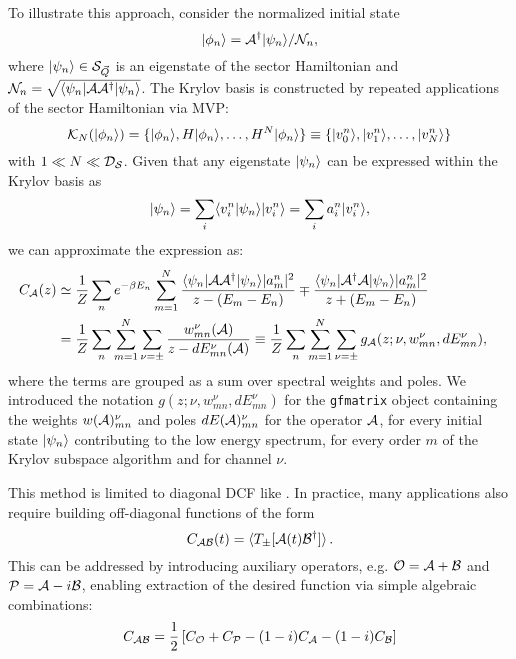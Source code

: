 \documentclass[edipack_sp.tex]{subfiles}
\begin{document}
To illustrate this approach, consider the normalized initial state
$$
\ket{\phi_n}=\AA^\dagger\ket{\psi_n}/\NN_n,
$$
where  $\ket{\psi_n}\in\SS_{\vec{Q}}$ is an eigenstate of the sector Hamiltonian and $\NN_n=\sqrt{\bra{\psi_n}\AA
  \AA^\dagger\ket{\psi_n}}$.
The Krylov basis is constructed by repeated applications of the sector Hamiltonian via MVP: 
$$
\mathcal{K}_{N} (\ket{\phi_n})=\{\ket{\phi_n}, H\ket{\phi_n}, \dots,
H^N\ket{\phi_n}\}\equiv \{\ket{v^n_0}, \ket{v^n_1},\dots, \ket{v^n_N}
\}
$$ 
with $1 \ll N \ll \DD_\SS$.
Given that any eigenstate $\ket{\psi_n}$ can be expressed within the Krylov basis as
$$
\ket{\psi_n} = \sum_i  \ibra v^n_i|\psi_n \iket  \ket{ v^n_i} =
\sum_i a^n_i \ket{v^n_i}, 
$$
we can approximate the expression  as:  
\begin{equation}
  \label{eqGKrylov}
  \begin{split}
    C_\AA(z)  &\simeq \frac{1}{Z}\sum_n e^{-\beta E_n}
    \sum_{m=1}^{N} \frac{\bra{\psi_n}\AA \AA^\dagger\ket{\psi_n} |a^n_m|^2}{
      z - (E_m-E_n)} \mp \frac{\bra{\psi_n}\AA^\dagger \AA\ket{\psi_n}
      |a^n_m|^2}{ z + (E_m-E_n)}\cr
    &= \frac{1}{Z}\sum_n\sum_{m=1}^{N} \sum_{\nu=\pm}\frac{w^{\nu}_{mn}(\AA)}{z - dE^\nu_{mn}(\AA)} 
    \equiv \frac{1}{Z}\sum_n
    \sum_{m=1}^{N} \sum_{\nu=\pm} g_\AA(z;\nu, w^{\nu}_{mn},  dE^\nu_{mn}), \cr
  \end{split}
\end{equation}
where the terms are grouped as a sum over spectral weights and
poles. We introduced the notation $g(z;\nu, w^{\nu}_{mn},  dE^\nu_{mn})$
for the {\tt gfmatrix} object containing the weights $w(\AA)^{\nu}_{mn}$ and
poles $dE(\AA)^{\nu}_{mn}$ for the operator $\AA$, for every initial state $\ket{\psi_n}$
contributing to the low energy spectrum, for every order $m$ of the
Krylov subspace algorithm and for channel $\nu$.

This method is  limited to diagonal DCF like
. In practice, many applications also require building off-diagonal
functions of the form
$$
C_{\AA\BB}(t) = \ibra T_{\pm}[\AA(t) \BB^\dagger]\iket\, .
$$
This can be addressed by introducing auxiliary operators, e.g.  $\OO=\AA +\BB$ and
$\PP=\AA-i\BB$, enabling extraction of the desired function via
simple algebraic combinations:
$$
C_{\AA\BB} = \frac{1}{2}\left[C_\OO + C_\PP - (1-i)C_\AA -(1-i)C_\BB\right]
$$
\end{document}
